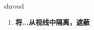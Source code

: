 
\begin{frame}
{\huge shroud}
\begin{center}
\begin{enumerate}\Large
  \item \textbf{将...从视线中隔离，遮蔽}
\end{enumerate}
\end{center}
\end{frame}
